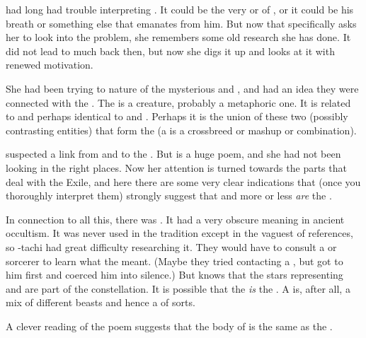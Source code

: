 \Urizeth had long had trouble interpreting .
It could be the very  or  of \Urzaz, or it could be his breath or something else that emanates from him.
But now that \Teshrial specifically asks her to look into the problem, she remembers some old research she has done.
It did not lead to much back then, but now she digs it up and looks at it with renewed motivation.

She had been trying to nature of the mysterious \Zaz and \Urzaz, and had an idea they were connected with the \quo{\Chimaera}.
The \Chimaera is a creature, probably a metaphoric one. 
It is related to and perhaps identical to \Zaz and \Urzaz.
Perhaps it is the union of these two (possibly contrasting entities) that form the \Chimaera (a \chimaera is a crossbreed or mashup or combination). 

\Urizeth suspected a link from \Zaz and \Urzaz to the \Chimaera. 
But \WanderersInDarknessEmph is a huge poem, and she had not been looking in the right places.
Now her attention is turned towards the parts that deal with the Exile, and here there are some very clear indications that (once you thoroughly interpret them) strongly suggest that \Zaz and \Urzaz more or less \emph{are} the \Chimaera.

In connection to all this, there was .
It had a very obscure meaning in ancient \draconian occultism.
It was never used in the \rethyactic tradition except in the vaguest of references, so \Urizeth-tachi had great difficulty researching it. 
They would have to consult a \dragon or \quiljaar sorcerer to learn what the \Malgryph meant.
(Maybe they tried contacting a \quiljaar, but \Ishnaruchaefir got to him first and coerced him into silence.)
But \Urizeth knows that the stars representing \Zaz and \Urzaz are part of the \Malgryph constellation.
It is possible that the \Malgryph \emph{is} the \quo{\Chimaera}.
A \malgryph is, after all, a mix of different beasts and hence a \chimaera of sorts.





\begin{comment}
  \section{The \chimaera and the \malgryph}
\end{comment}
A clever reading of the poem suggests that the body of \Zaz is the same as the . 


